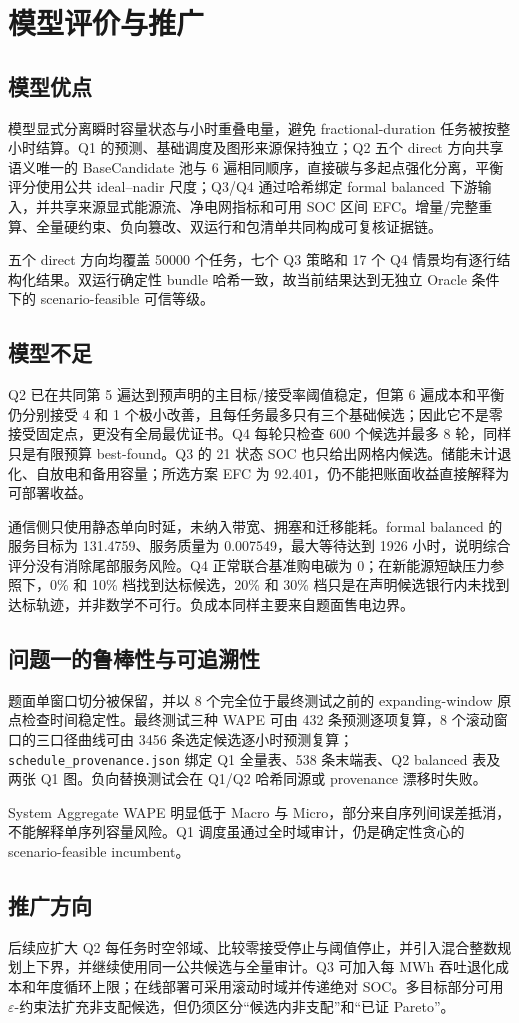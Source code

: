 \section{模型评价与推广}
\subsection{模型优点}
模型显式分离瞬时容量状态与小时重叠电量，避免 fractional-duration 任务被按整小时结算。Q1 的预测、基础调度及图形来源保持独立；Q2 五个 direct 方向共享语义唯一的 BaseCandidate 池与 6 遍相同顺序，直接碳与多起点强化分离，平衡评分使用公共 ideal--nadir 尺度；Q3/Q4 通过哈希绑定 formal balanced 下游输入，并共享来源显式能源流、净电网指标和可用 SOC 区间 EFC。增量/完整重算、全量硬约束、负向篡改、双运行和包清单共同构成可复核证据链。

五个 direct 方向均覆盖 50000 个任务，七个 Q3 策略和 17 个 Q4 情景均有逐行结构化结果。双运行确定性 bundle 哈希一致，故当前结果达到无独立 Oracle 条件下的 scenario-feasible 可信等级。

\subsection{模型不足}
Q2 已在共同第 5 遍达到预声明的主目标/接受率阈值稳定，但第 6 遍成本和平衡仍分别接受 4 和 1 个极小改善，且每任务最多只有三个基础候选；因此它不是零接受固定点，更没有全局最优证书。Q4 每轮只检查 600 个候选并最多 8 轮，同样只是有限预算 best-found。Q3 的 21 状态 SOC 也只给出网格内候选。储能未计退化、自放电和备用容量；所选方案 EFC 为 92.401，仍不能把账面收益直接解释为可部署收益。

通信侧只使用静态单向时延，未纳入带宽、拥塞和迁移能耗。formal balanced 的服务目标为 131.4759、服务质量为 0.007549，最大等待达到 1926 小时，说明综合评分没有消除尾部服务风险。Q4 正常联合基准购电碳为 0；在新能源短缺压力参照下，0\% 和 10\% 档找到达标候选，20\% 和 30\% 档只是在声明候选银行内未找到达标轨迹，并非数学不可行。负成本同样主要来自题面售电边界。

\subsection{问题一的鲁棒性与可追溯性}
题面单窗口切分被保留，并以 8 个完全位于最终测试之前的 expanding-window 原点检查时间稳定性。最终测试三种 WAPE 可由 432 条预测逐项复算，8 个滚动窗口的三口径曲线可由 3456 条选定候选逐小时预测复算；\texttt{schedule\_provenance.json} 绑定 Q1 全量表、538 条末端表、Q2 balanced 表及两张 Q1 图。负向替换测试会在 Q1/Q2 哈希同源或 provenance 漂移时失败。

System Aggregate WAPE 明显低于 Macro 与 Micro，部分来自序列间误差抵消，不能解释单序列容量风险。Q1 调度虽通过全时域审计，仍是确定性贪心的 scenario-feasible incumbent。

\subsection{推广方向}
后续应扩大 Q2 每任务时空邻域、比较零接受停止与阈值停止，并引入混合整数规划上下界，并继续使用同一公共候选与全量审计。Q3 可加入每 MWh 吞吐退化成本和年度循环上限；在线部署可采用滚动时域并传递绝对 SOC。多目标部分可用 $\varepsilon$-约束法扩充非支配候选\cite{miettinen1999nonlinear}，但仍须区分“候选内非支配”和“已证 Pareto”。
